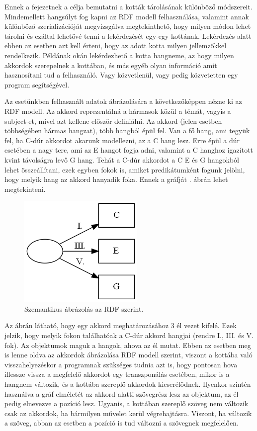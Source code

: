 
Ennek a fejezetnek a célja bemutatni a kották tárolásának különböző módszereit. Mindemellett hangsúlyt fog kapni az RDF modell felhasználása, valamint annak különböző szerializációját megvizsgálva megtekinthető, hogy milyen módon lehet tárolni és ezáltal lehetővé tenni a lekérdezését egy-egy kottának. Lekérdezés alatt ebben az esetben azt kell érteni, hogy az adott kotta milyen jellemzőkkel rendelkezik. Példának okán lekérdezhető a kotta hangneme, az hogy milyen akkordok szerepelnek a kottában, és más egyéb olyan információ amit hasznosítani tud a felhasználó. Vagy közvetlenül, vagy pedig közvetetten egy program segítségével.


Az esetünkben felhasznált adatok ábrázolására a következőképpen nézne ki az RDF modell. Az akkord reprezentálná a hármasok közül a témát, vagyis a subject-et, mivel azt kellene először definiálni. Az akkord (jelen esetben többségében hármas hangzat), több hangból épül fel. Van a fő hang, ami tegyük fel, ha C-dúr akkordot akarunk modellezni, az a C hang lesz. Erre épül a dúr esetében a nagy terc, ami az E hangot fogja adni, valamint a C hanghoz igazított kvint távolságra levő G hang. Tehát a C-dúr akkordot a C E és G hangokból lehet összeállítani, ezek egyben fokok is, amiket predikátumként fogunk jelölni, hogy melyik hang az akkord hanyadik foka. Ennek a gráfját . ábrán lehet megtekinteni.

\begin{figure}[h]
	\includegraphics[scale=1]{images/img_src/rdf_graph.png}
	\caption{Szemantikus ábrázolás az RDF szerint.}
	\label{fig:graph1}
\end{figure}

Az ábrán látható, hogy egy akkord meghatározásához 3 él vezet kifelé. Ezek jelzik, hogy melyik fokon találhatóak a C-dúr akkord hangjai (rendre I., III. és V. fok). Az objektumok maguk a hangok, ahova az él mutat. Ebben az esetben meg is lenne oldva az akkordok ábrázolása RDF modell szerint, viszont a kottába való visszahelyezéskor a programnak szükséges tudnia azt is, hogy pontosan hova illessze vissza a megfelelő akkordot egy transzponálás esetében, mikor is a hangnem változik, és a kottába szereplő akkordok kicserélődnek. 
Ilyenkor szintén használva a gráf elméletét az akkord alatti szövegrész lesz az objektum, az él pedig elnevezve a pozíció lesz. Ugyanis, a kottában szereplő szöveg nem változik csak az akkordok, ha bármilyen művelet kerül végrehajtásra. Viszont, ha változik a szöveg, abban az esetben a pozíció is tud változni a szövegnek megfelelően.

